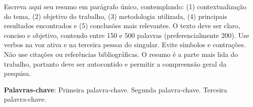 \begin{resumo}

Escreva aqui seu resumo em parágrafo único, contemplando: (1) contextualização do tema, (2) objetivo do trabalho, (3) metodologia utilizada, (4) principais resultados encontrados e (5) conclusões mais relevantes. O texto deve ser claro, conciso e objetivo, contendo entre 150 e 500 palavras (preferencialmente 200). Use verbos na voz ativa e na terceira pessoa do singular. Evite símbolos e contrações. Não use citações ou referências bibliográficas. O resumo é a parte mais lida do trabalho, portanto deve ser autocontido e permitir a compreensão geral da pesquisa.

 \vspace{\onelineskip}
    
 \noindent
 \textbf{Palavras-chave}: Primeira palavra-chave. Segunda palavra-chave. Terceira palavra-chave.
\end{resumo}
